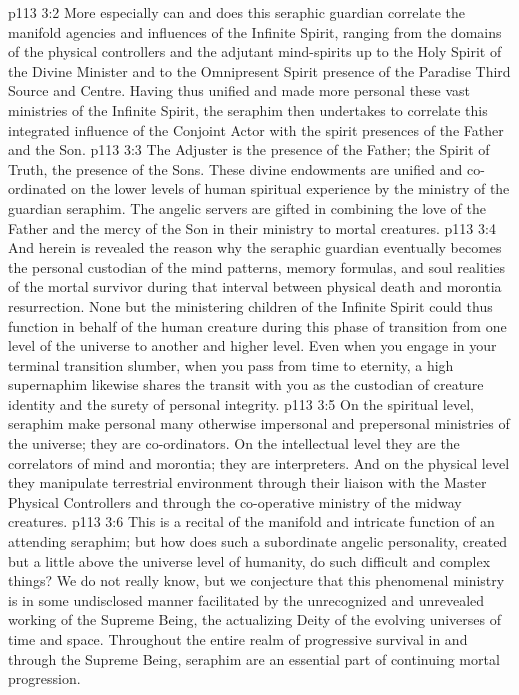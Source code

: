 \vs p113 3:2 More especially can and does this seraphic guardian correlate the manifold agencies and influences of the Infinite Spirit, ranging from the domains of the physical controllers and the adjutant mind\hyp{}spirits up to the Holy Spirit of the Divine Minister and to the Omnipresent Spirit presence of the Paradise Third Source and Centre. Having thus unified and made more personal these vast ministries of the Infinite Spirit, the seraphim then undertakes to correlate this integrated influence of the Conjoint Actor with the spirit presences of the Father and the Son.
\vs p113 3:3 The Adjuster is the presence of the Father; the Spirit of Truth, the presence of the Sons. These divine endowments are unified and co\hyp{}ordinated on the lower levels of human spiritual experience by the ministry of the guardian seraphim. The angelic servers are gifted in combining the love of the Father and the mercy of the Son in their ministry to mortal creatures.
\vs p113 3:4 And herein is revealed the reason why the seraphic guardian eventually becomes the personal custodian of the mind patterns, memory formulas, and soul realities of the mortal survivor during that interval between physical death and morontia resurrection. None but the ministering children of the Infinite Spirit could thus function in behalf of the human creature during this phase of transition from one level of the universe to another and higher level. Even when you engage in your terminal transition slumber, when you pass from time to eternity, a high supernaphim likewise shares the transit with you as the custodian of creature identity and the surety of personal integrity.
\vs p113 3:5 On the spiritual level, seraphim make personal many otherwise impersonal and prepersonal ministries of the universe; they are co\hyp{}ordinators. On the intellectual level they are the correlators of mind and morontia; they are interpreters. And on the physical level they manipulate terrestrial environment through their liaison with the Master Physical Controllers and through the co\hyp{}operative ministry of the midway creatures.
\vs p113 3:6 This is a recital of the manifold and intricate function of an attending seraphim; but how does such a subordinate angelic personality, created but a little above the universe level of humanity, do such difficult and complex things? We do not really know, but we conjecture that this phenomenal ministry is in some undisclosed manner facilitated by the unrecognized and unrevealed working of the Supreme Being, the actualizing Deity of the evolving universes of time and space. Throughout the entire realm of progressive survival in and through the Supreme Being, seraphim are an essential part of continuing mortal progression.
